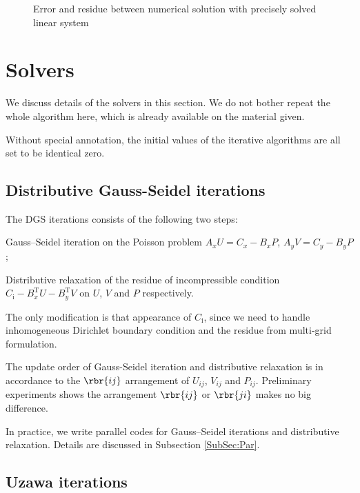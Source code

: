 \documentclass[english, nochinese]{pnote}
\begin{document}
\begin{figure}[htbp]
\centering
\scalebox{0.75}{}
\caption{Error and residue between numerical solution with precisely solved linear system}
\label{Fig:Precise}
\end{figure}

\section{Solvers}

We discuss details of the solvers in this section. We do not bother repeat the whole algorithm here, which is already available on the material given.

Without special annotation, the initial values of the iterative algorithms are all set to be identical zero.

\subsection{Distributive Gauss-Seidel iterations}

The DGS iterations consists of the following two steps:
\begin{partlist}
\item Gauss--Seidel iteration on the Poisson problem $ A_x U = C_x - B_x P $, $ A_y V = C_y - B_y P $;
\item Distributive relaxation of the residue of incompressible condition $ C_{\text{i}} - B_x^{\text{T}} U - B_y^{\text{T}} V $ on $U$, $V$ and $P$ respectively.
\end{partlist}
The only modification is that appearance of $C_{\text{i}}$, since we need to handle inhomogeneous Dirichlet boundary condition and the residue from multi-grid formulation.

The update order of Gauss-Seidel iteration and distributive relaxation is in accordance to the $ \rbr{ i j } $ arrangement of $ U_{ i j } $, $ V_{ i j } $ and $ P_{ i j } $. Preliminary experiments shows the arrangement $ \rbr{ i j } $ or $ \rbr{ j i } $ makes no big difference.

In practice, we write parallel codes for Gauss--Seidel iterations and distributive relaxation. Details are discussed in Subsection \ref{SubSec:Par}.

\subsection{Uzawa iterations}
\end{document}
